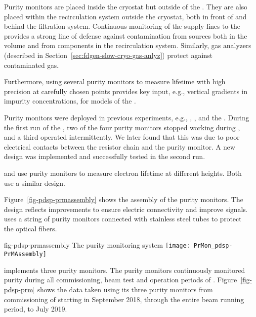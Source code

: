 Purity monitors are placed inside the cryostat but outside of the %
. They are also placed  within the recirculation system outside the cryostat, both in front of and behind the filtration system. %
Continuous monitoring of  the  supply lines to the  provides a strong line of defense against %
contamination from sources both in the  volume and from components in the recirculation system. 
Similarly, gas analyzers (described in Section~\ref{sec:fdgen-slow-cryo-gas-anlyz}) %
protect against contaminated gas.  

Furthermore, using several purity monitors to measure lifetime with high precision at carefully chosen points provides key input, e.g.,  vertical gradients in impurity concentrations, for  models of the .

Purity monitors were deployed in previous  experiments, e.g., , \microboone, and the . During the first run of the , two of the four purity monitors stopped working during \cooldown, and a third operated intermittently. We later found that this was due to poor electrical contacts between the resistor chain and the purity monitor. A new design was implemented and successfully tested in the second run. 


 and  %
use purity monitors to %
measure electron lifetime at different heights. Both use a similar design. 

Figure~\ref{fig-pdsp-prmassembly} shows the assembly of the  purity monitors. The design reflects improvements to ensure electric connectivity and improve signals.  uses a string of purity monitors connected with stainless steel tubes to protect the optical fibers. 

\begin{dunefigure}{fig-pdsp-prmassembly}
  {The  purity monitoring system}
  \texttt{[image: PrMon\_pdsp-PrMAssembly]}
\end{dunefigure}


 implements three purity monitors. The purity monitors continuously monitored  purity during all commissioning, beam test and operation periods of . Figure~\ref{fig-pdsp-prm} shows the  data taken using %
its three purity monitors from commissioning of  starting in September 2018, through the entire beam running period, to July 2019.

